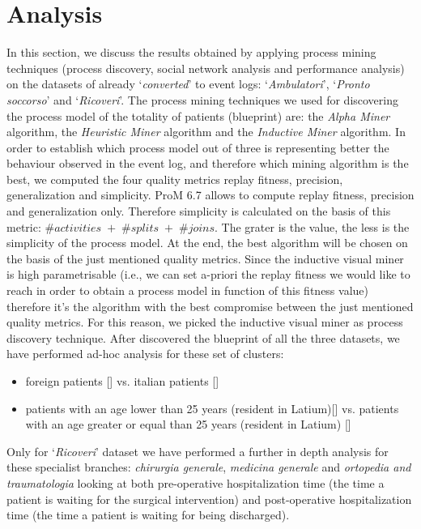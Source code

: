 \section{Analysis} \label{analysis}
In this section, we discuss the results obtained by applying process mining techniques (process discovery, social network analysis and performance analysis) on the datasets of \hospital already `\textit{converted}' to event logs: `\textit{Ambulatori}', `\textit{Pronto soccorso}' and `\textit{Ricoveri}'. The process mining techniques we used for discovering the process model of the totality of patients (blueprint) are: the \textit{Alpha Miner} algorithm, the \textit{Heuristic Miner} algorithm and the \textit{Inductive Miner} algorithm. In order to establish which process model out of three is representing better the behaviour observed in the event log, and therefore which mining algorithm is the best, we computed the four quality metrics replay fitness, precision, generalization and simplicity. ProM 6.7 allows to compute replay fitness, precision and generalization only. Therefore simplicity is calculated on the basis of this metric: \#$activities \;+\;$\#$splits \;+\; $\#$joins$. The grater is the value, the less is the simplicity of the process model. At the end, the best algorithm will be chosen on the basis of the just mentioned quality metrics. Since the inductive visual miner is high parametrisable (i.e., we can set a-priori the replay fitness we would like to reach in order to obtain a process model in function of this fitness value) therefore it's the algorithm with the best compromise between the just mentioned quality metrics. For this reason, we picked the inductive visual miner as process discovery technique. After discovered the blueprint of all the three datasets, we have performed ad-hoc analysis for these set of clusters:
\begin{itemize}
\item foreign patients [] vs. italian patients []
\item patients with an age lower than 25 years (resident in Latium)[] vs. patients with an age greater or equal than 25 years (resident in Latium) []
\end{itemize}
Only for `\textit{Ricoveri}' dataset we have performed a further in depth analysis for these specialist branches: \textit{chirurgia generale}, \textit{medicina generale} and \textit{ortopedia and traumatologia} looking at both pre-operative hospitalization time (the time a patient is waiting for the surgical intervention) and post-operative hospitalization time (the time a patient is waiting for being discharged).
\clearpage
